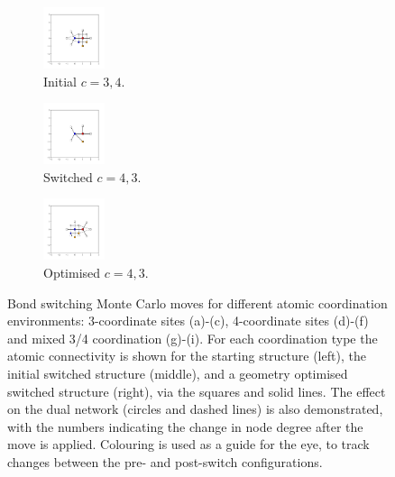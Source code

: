 \begin{figure}[h]
     \vspace{5mm}
     \begin{subfigure}[b]{0.25\textwidth}
         \centering
         \includegraphics[height=1.8cm]{./figures/general_networks/bs_move_g.pdf}
         \caption{Initial $c=3,4$.}
         \label{fig:bsmoveg}
     \end{subfigure}
     \hfill
     \begin{subfigure}[b]{0.25\textwidth}
         \centering
         \includegraphics[height=1.8cm]{./figures/general_networks/bs_move_h.pdf}
         \caption{Switched $c=4,3$.}
         \label{fig:bsmoveh}
     \end{subfigure}
     \hfill
     \begin{subfigure}[b]{0.25\textwidth}
         \centering
         \includegraphics[height=1.8cm]{./figures/general_networks/bs_move_i.pdf}
         \caption{Optimised $c=4,3$.}
         \label{fig:bsmovei}
     \end{subfigure}
     
     \caption{Bond switching Monte Carlo moves for different atomic coordination environments: 3\--coordinate sites (a)-(c), 4\--coordinate sites (d)-(f) and mixed 3/4 coordination (g)-(i). For each coordination type the atomic connectivity is shown for the starting structure (left), the initial switched structure (middle), and a geometry optimised switched structure (right), via the squares and solid lines. The effect on the dual network (circles and dashed lines) is also demonstrated, with the numbers indicating the change in node degree after the move is applied. Colouring is used as a guide for the eye, to track changes between the pre\-- and post\--switch configurations.
}
     \label{fig:bsmoves}
\end{figure}

